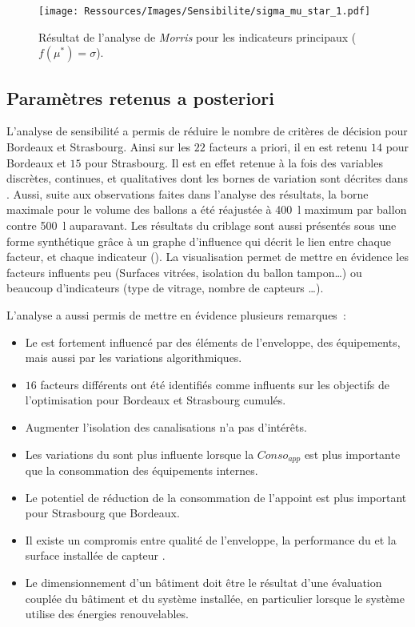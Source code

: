 \begin{figure}
    \centering
    \texttt{[image: Ressources/Images/Sensibilite/sigma\_mu\_star\_1.pdf]}
    \caption{Résultat de l’analyse de \textit{Morris} pour les indicateurs principaux
             ($f(\mu^{*}) = \sigma$).}
    \label{fig:objectifs_mu_star}
\end{figure}



\subsection{Paramètres retenus a posteriori} %
\label{sub:parametres_retenus_a_posteriori}
L’analyse de sensibilité a permis de réduire le nombre de critères de décision
pour Bordeaux et Strasbourg. Ainsi sur les $22$ facteurs a priori, il en est retenu
$14$ pour Bordeaux et $15$ pour Strasbourg.  Il est en effet retenue à la fois des variables discrètes, continues,
et qualitatives dont les bornes de variation sont décrites dans .
Aussi, suite aux observations faites dans l’analyse des résultats, la borne maximale pour le volume des
ballons a été réajustée à \SI{400}{\litre} maximum par ballon contre \SI{500}{\litre}
auparavant.
Les résultats du criblage sont aussi présentés sous une forme synthétique grâce à un
graphe d’influence qui décrit le lien entre chaque facteur, et chaque indicateur
(). La visualisation permet de mettre en évidence
les facteurs influents peu (Surfaces vitrées, isolation du ballon tampon\dots) ou beaucoup
d’indicateurs (type de vitrage, nombre de capteurs \dots).

L’analyse a aussi permis de mettre en évidence plusieurs remarques~:
\begin{itemize}
  \item Le  est fortement influencé par des éléments de l’enveloppe, des équipements,
        mais aussi par les variations algorithmiques.
  \item $16$ facteurs différents ont été identifiés comme influents sur les objectifs de
        l’optimisation pour Bordeaux et Strasbourg cumulés.
  \item Augmenter l’isolation des canalisations n’a pas d’intérêts.
  \item Les variations du  sont plus influente lorsque la $Conso_{app}$
        est plus importante que la consommation des équipements internes.
  \item Le potentiel de réduction de la consommation de l’appoint est plus important
        pour Strasbourg que Bordeaux.
  \item Il existe un compromis entre qualité de l’enveloppe, la performance du 
        et la surface installée de capteur .
  \item Le dimensionnement d’un bâtiment doit être le résultat d’une évaluation
        couplée du bâtiment et du système installée, en particulier lorsque le système
        utilise des énergies renouvelables.
\end{itemize}

